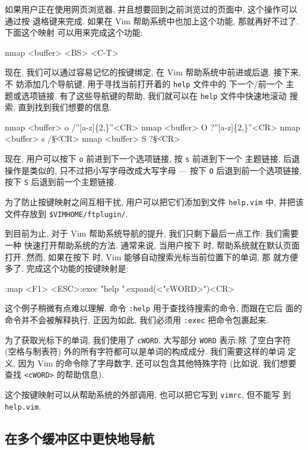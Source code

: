 如果用户正在使用网页浏览器, 并且想要回到之前浏览过的页面中, 这个操作可以通过按
退格键来完成. 如果在 Vim 帮助系统中也加上这个功能, 那就再好不过了. 下面这个映射
可以用来完成这个功能:
\begin{vimcmd}
nmap <buffer> <BS> <C-T>
\end{vimcmd}

现在, 我们可以通过容易记忆的按键绑定, 在 Vim 帮助系统中前进或后退. 接下来, 不
妨添加几个导航键, 用于寻找当前打开着的 \texttt{help} 文件中的 下一个/前一个 主
题或选项链接. 有了这些导航键的帮助, 我们就可以在 \texttt{help} 文件中快速地滚动
搜索, 直到找到我们想要的信息.
\begin{vimcmd}
nmap <buffer> o /''[a-z]\{2,\}''<CR>
nmap <buffer> O ?''[a-z]\{2,\}''<CR>
nmap <buffer> s /\|\S\+\|<CR>
nmap <buffer> S ?\|\S\+\|<CR>
\end{vimcmd}

现在, 用户可以按下 \texttt{o} 前进到下一个选项链接, 按 \texttt{s} 前进到下一个 
主题链接, 后退操作是类似的, 只不过把小写字母改成大写字母 --- 按下 \texttt{O}
后退到前一个选项链接, 按下 \texttt{S} 后退到前一个主题链接.

\begin{warning}
    为了防止按键映射之间互相干扰, 用户可以把它们添加到文件 \texttt{help.vim} 中,
    并把该文件存放到 \verb'$VIMHOME/ftplugin/'.
\end{warning}

到目前为止, 对于 Vim 帮助系统导航的提升, 我们只剩下最后一点工作: 我们需要一种
快速打开帮助系统的方法. 通常来说, 当用户按下  时, 帮助系统就在默认页面
打开. 然而, 如果在按下  时, Vim 能够自动搜索光标当前位置下的单词, 那
就方便多了. 完成这个功能的按键映射是:
\begin{vimcmd}
:map <F1> <ESC>:exec "help ".expand(<"cWORD>")<CR>
\end{vimcmd}
这个例子稍微有点难以理解. 命令 \texttt{:help} 用于查找待搜索的命令, 而跟在它后
面的命令并不会被解释执行, 正因为如此, 我们必须用 \texttt{:exec} 把命令包裹起来.

为了获取光标下的单词, 我们使用了 \texttt{cWORD}. 大写部分 \texttt{WORD} 表示:除
了空白字符 (空格与制表符) 外的所有字符都可以是单词的构成成分. 我们需要这样的单词
定义, 因为 Vim 的命令除了字母数字, 还可以包含其他特殊字符 (比如说, 我们想要查找
\texttt{<cWORD>} 的帮助信息).

这个按键映射可以从帮助系统的外部调用, 也可以把它写到 \texttt{vimrc}, 但不能写
到 \texttt{help.vim}.

\subsection{在多个缓冲区中更快地导航}
\label{subsec:faster_navigation_in_multiple_buffers}

